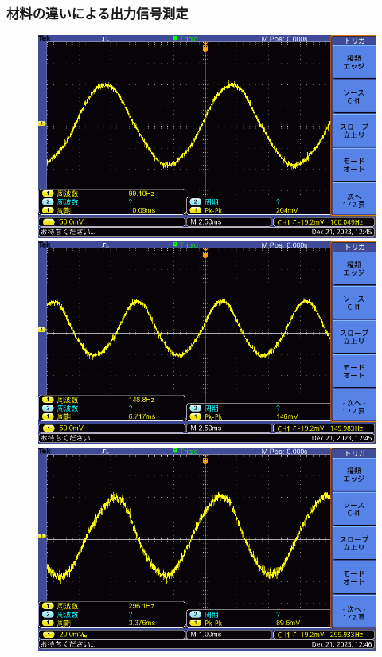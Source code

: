 \documentclass{ltjsarticle}
\begin{document}
		\subsubsection{材料の違いによる出力信号測定}
			\begin{figure}[H]
			\centering
			\begin{minipage}{0.4\columnwidth}
			\centering
			\includegraphics[width = \columnwidth]{figs/F0021TEK.PNG}
			\end{minipage}
			\hspace{0.04\columnwidth}
			\begin{minipage}{0.4\columnwidth}
			\centering
			\includegraphics[width = \columnwidth]{figs/F0022TEK.PNG}
			\end{minipage}
			\hspace{0.04\columnwidth}
			\begin{minipage}{0.4\columnwidth}
			\centering
			\includegraphics[width = \columnwidth]{figs/F0023TEK.PNG}

\end{minipage}
\end{figure}
\end{document}
